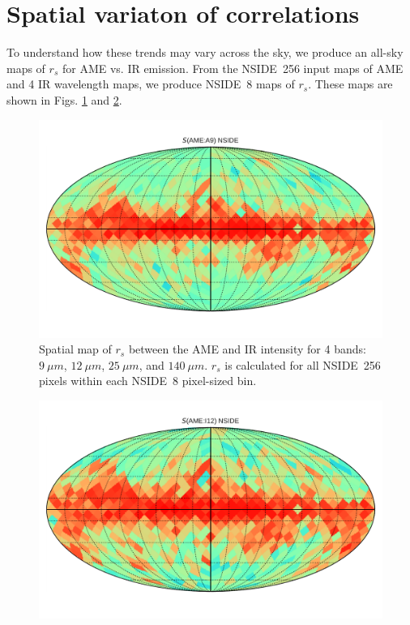   \section{Spatial variaton of correlations}
    To understand how these trends may vary across the sky, we produce an all-sky maps of $r_{s}$ for AME vs. IR emission. From the NSIDE~256 input maps of AME and 4 IR wavelength maps, we produce NSIDE~8 maps of $r_{s}$. These maps are shown in Figs. \ref{fig:Spearman_Map_nside8_AMEtoIR_A9} and \ref{fig:Spearman_Map_nside8_AMEtoIR_I12}.
      \begin{figure}
        \includegraphics[width=\textwidth]{../Plots/Allsky_Corr/Spearman_Map_nside8_AMEtoA9.pdf}
        \centering
        \caption{Spatial map of $r_{s}$ between the AME and IR intensity for 4 bands:$9~\mu{}m$, $12~\mu{}m$, $25~\mu{}m$, and $140~\mu{}m$. $r_{s}$ is calculated for all NSIDE~256 pixels within each NSIDE~8 pixel-sized bin.}
        \label{fig:Spearman_Map_nside8_AMEtoIR_A9}
      \end{figure}
      \begin{figure}
        \includegraphics[width=\textwidth]{../Plots/Allsky_Corr/Spearman_Map_nside8_AMEtoI12.pdf}
        \centering
        \caption{}
        \label{fig:Spearman_Map_nside8_AMEtoIR_I12}
      \end{figure}

